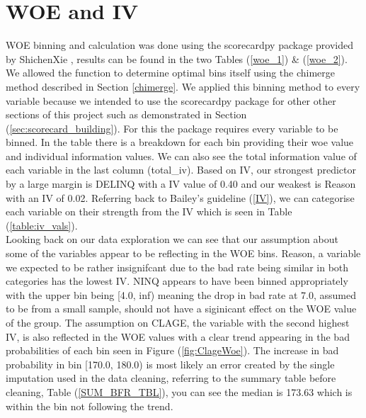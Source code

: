 \section{WOE and IV}

WOE binning and calculation was done using the scorecardpy package provided by ShichenXie \parencite{scorecardpy},  results can be found in the two Tables (\ref{woe_1}) \& (\ref{woe_2}). We allowed the function to determine optimal bins itself using the chimerge method described in Section \ref{chimerge}. We applied this binning method to every variable because we intended to use the scorecardpy package for other other sections of this project such as demonstrated in Section (\ref{sec:scorecard_building}). For this the package requires every variable to be binned. In the table there is a breakdown for each bin providing their woe value and individual information values. We can also see the total information value of each variable in the last column (total\_iv). Based on IV, our strongest predictor by a large margin is DELINQ with a IV value of 0.40 and our weakest is Reason with an IV of 0.02. Referring back to Bailey's guideline (\ref{IV})\parencite{bailey2004credit}, we can categorise each variable on their strength from the IV which is seen in Table (\ref{table:iv_vals}).\\

Looking back on our data exploration we can see that our assumption about some of the variables appear to be reflecting in the WOE bins. Reason, a variable we expected to be rather insignifcant due to the bad rate being similar in both categories has the lowest IV. NINQ appears to have been binned appropriately with the upper bin being [4.0, inf) meaning the drop in bad rate at 7.0, assumed to be from a small sample, should not have a siginicant effect on the WOE value of the group. The assumption on CLAGE, the variable with the second highest IV, is also reflected in the WOE values with a clear trend appearing in the bad probabilities of each bin seen in Figure (\ref{fig:ClageWoe}). The increase in bad probability in bin [170.0, 180.0) is most likely an error created by the single imputation used in the data cleaning, referring to the summary table before cleaning, Table (\ref{SUM_BFR_TBL}), you can see the median is 173.63 which is within the bin not following the trend.

